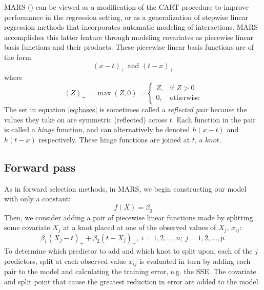 \documentclass[12pt]{article}
\begin{document}
MARS (\cite{mars}) can be viewed as a modification of the CART procedure to improve performance in the regression setting, or as a generalization of stepwise linear regression methods that incorporates automatic modeling of interactions. MARS accomplishes this latter feature through modeling covariates as piecewise linear basis functions and their products. These piecewise linear basis functions are of the form
%
\begin{equation} \label{eq:bases}
  (x - t)_{+} \text{ and } (t - x)_{+}
\end{equation} where
%
\begin{equation}
  (Z)_{+} = \max(Z, 0) = \begin{cases}
  Z, & \text{if } Z > 0 \\
  0, & \text{otherwise}
  \end{cases}
\end{equation}
The set in equation \ref{eq:bases} is sometimes called a \emph{reflected pair} because the values they take on are symmetric (reflected) across $t$. Each function in the pair is called a \emph{hinge} function, and can alternatively be denoted $h(x - t)$ and $h(t - x)$ respectively. These hinge functions are joined at $t$, a $knot$.

\subsection{Forward pass} %
\label{sub:forward_pass}

As in forward selection methods, in MARS, we begin constructing our model with only a constant:
\begin{equation}
  f(X) = \beta_{0}
\end{equation}
Then, we consider adding a pair of piecewise linear functions made by splitting some covariate $X_{j}$ at a knot placed at one of the observed values of $X_{j}$, $x_{ij}$:
\begin{equation}
\beta_{1} (X_{j} - t)_{+} + \beta_{2}(t - X_{j})_{+}, \ i = 1, 2, \ldots, n; \ j = 1, 2, \ldots, p.
\end{equation}
To determine which predictor to add and which knot to split upon, each of the $j$ predictors, split at each observed value $x_{ij}$ is evaluated in turn by adding each pair to the model and calculating the training error, e.g. the SSE. The covariate and split point that cause the greatest reduction in error are added to the model.
\end{document}
